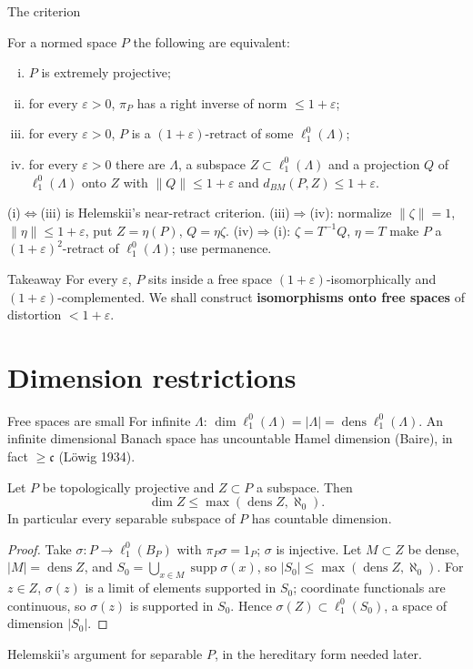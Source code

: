 \documentclass[10pt,aspectratio=169]{beamer}
\newcommand{\lo}[1]{\ell_1^0(#1)}
\newcommand{\supp}{\operatorname{supp}}
\newcommand{\dens}{\operatorname{dens}}
\newcommand{\BM}{d_{BM}}
\begin{document}
\begin{frame}{The criterion}
  \begin{theorem}
    For a normed space $P$ the following are equivalent:
    \begin{enumerate}[(i)]
      \item $P$ is extremely projective;
      \item for every $\varepsilon>0$, $\pi_P$ has a right inverse of norm $\le1+\varepsilon$;
      \item for every $\varepsilon>0$, $P$ is a $(1+\varepsilon)$-retract of some $\lo\Lambda$;
      \item for every $\varepsilon>0$ there are $\Lambda$, a subspace
        $Z\subset\lo\Lambda$ and a projection $Q$ of $\lo\Lambda$ onto $Z$ with
        $\|Q\|\le1+\varepsilon$ and $\BM(P,Z)\le1+\varepsilon$.
    \end{enumerate}
  \end{theorem}
  (i)$\Leftrightarrow$(iii) is Helemskii's near-retract criterion.
  (iii)$\Rightarrow$(iv): normalize $\|\zeta\|=1$, $\|\eta\|\le1+\varepsilon$,
  put $Z=\eta(P)$, $Q=\eta\zeta$.
  (iv)$\Rightarrow$(i): $\zeta=T^{-1}Q$, $\eta=T$ make $P$ a
  ${(1+\varepsilon)}^2$-retract of $\lo\Lambda$; use permanence.
  \begin{alertblock}{Takeaway}
    For every $\varepsilon$, $P$ sits inside a free space
    $(1+\varepsilon)$-isomorphically and $(1+\varepsilon)$-complemented.
    We shall construct \textbf{isomorphisms onto free spaces} of
    distortion $<1+\varepsilon$.
  \end{alertblock}
\end{frame}

\section{Dimension restrictions}

\begin{frame}{Free spaces are small}
  For infinite $\Lambda$: $\dim\lo\Lambda=|\Lambda|=\dens\lo\Lambda$. An infinite
  dimensional Banach space has uncountable Hamel dimension (Baire), in fact
  $\ge\mathfrak c$ (L\"owig 1934).
  \begin{theorem}
    Let $P$ be topologically projective and $Z\subset P$ a subspace. Then
    \[
      \dim Z\le\max(\dens Z,\aleph_0).
    \]
    In particular every separable subspace of $P$ has countable dimension.
  \end{theorem}
  \begin{proof}
    Take $\sigma\colon P\to\lo{B_P}$ with $\pi_P\sigma=1_P$; $\sigma$ is injective.
    Let $M\subset Z$ be dense, $|M|=\dens Z$, and
    $S_0=\bigcup_{x\in M}\supp\sigma(x)$, so $|S_0|\le\max(\dens Z,\aleph_0)$.
    For $z\in Z$, $\sigma(z)$ is a limit of elements supported in $S_0$;
    coordinate functionals are continuous, so $\sigma(z)$ is supported in $S_0$.
    Hence $\sigma(Z)\subset\lo{S_0}$, a space of dimension $|S_0|$.
  \end{proof}
  Helemskii's argument for separable $P$, in the hereditary form needed later.
\end{frame}
\end{document}
